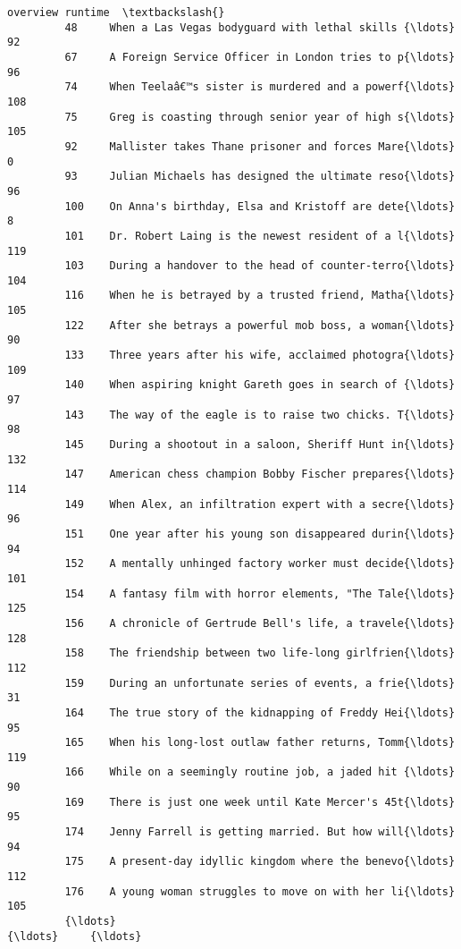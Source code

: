 \documentclass[11pt]{article}
\begin{document}
\begin{Verbatim}[commandchars=\\\{\}]
                                                         overview runtime  \textbackslash{}
         48     When a Las Vegas bodyguard with lethal skills {\ldots}      92   
         67     A Foreign Service Officer in London tries to p{\ldots}      96   
         74     When Teelaâ€™s sister is murdered and a powerf{\ldots}     108   
         75     Greg is coasting through senior year of high s{\ldots}     105   
         92     Mallister takes Thane prisoner and forces Mare{\ldots}       0   
         93     Julian Michaels has designed the ultimate reso{\ldots}      96   
         100    On Anna's birthday, Elsa and Kristoff are dete{\ldots}       8   
         101    Dr. Robert Laing is the newest resident of a l{\ldots}     119   
         103    During a handover to the head of counter-terro{\ldots}     104   
         116    When he is betrayed by a trusted friend, Matha{\ldots}     105   
         122    After she betrays a powerful mob boss, a woman{\ldots}      90   
         133    Three years after his wife, acclaimed photogra{\ldots}     109   
         140    When aspiring knight Gareth goes in search of {\ldots}      97   
         143    The way of the eagle is to raise two chicks. T{\ldots}      98   
         145    During a shootout in a saloon, Sheriff Hunt in{\ldots}     132   
         147    American chess champion Bobby Fischer prepares{\ldots}     114   
         149    When Alex, an infiltration expert with a secre{\ldots}      96   
         151    One year after his young son disappeared durin{\ldots}      94   
         152    A mentally unhinged factory worker must decide{\ldots}     101   
         154    A fantasy film with horror elements, "The Tale{\ldots}     125   
         156    A chronicle of Gertrude Bell's life, a travele{\ldots}     128   
         158    The friendship between two life-long girlfrien{\ldots}     112   
         159    During an unfortunate series of events, a frie{\ldots}      31   
         164    The true story of the kidnapping of Freddy Hei{\ldots}      95   
         165    When his long-lost outlaw father returns, Tomm{\ldots}     119   
         166    While on a seemingly routine job, a jaded hit {\ldots}      90   
         169    There is just one week until Kate Mercer's 45t{\ldots}      95   
         174    Jenny Farrell is getting married. But how will{\ldots}      94   
         175    A present-day idyllic kingdom where the benevo{\ldots}     112   
         176    A young woman struggles to move on with her li{\ldots}     105   
         {\ldots}                                                  {\ldots}     {\ldots}   

\end{Verbatim}
\end{document}
